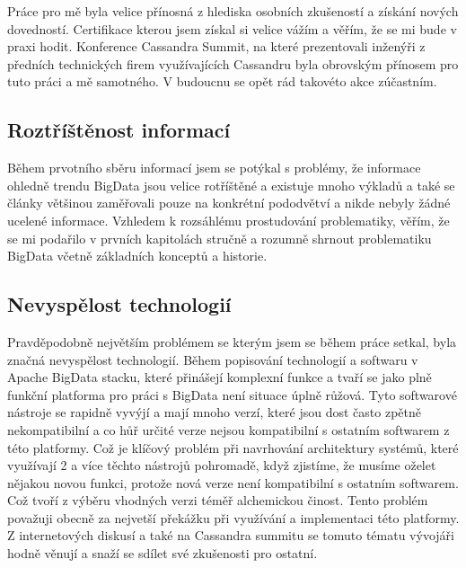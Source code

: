 Práce pro mě byla velice přínosná z hlediska osobních zkušeností a získání nových dovedností. Certifikace kterou jsem získal si velice vážím a věřím, že se mi bude v praxi hodit. Konference Cassandra Summit, na které prezentovali inženýři z předních technických firem využívajících Cassandru byla obrovským přínosem pro tuto práci a mě samotného. V budoucnu se opět rád takovéto akce zúčastním. 

\subsection{Roztříštěnost informací}
Během prvotního sběru informací jsem se potýkal s problémy, že informace ohledně trendu BigData jsou velice rotříštěné a existuje mnoho výkladů a také se články většinou zaměřovali pouze na konkrétní pododvětví a nikde nebyly žádné ucelené informace. Vzhledem k rozsáhlému prostudování problematiky, věřím, že se mi podařilo v prvních kapitolách stručně a rozumně shrnout problematiku BigData včetně základních konceptů a historie. 

\subsection{Nevyspělost technologií}
Pravděpodobně největším problémem se kterým jsem se během práce setkal, byla značná nevyspělost technologií. Během popisování technologií a softwaru v Apache BigData stacku, které přinášejí komplexní funkce a tvaří se jako plně funkční platforma pro práci s BigData není situace úplně růžová. Tyto softwarové nástroje se rapidně vyvýjí a mají mnoho verzí, které jsou dost často zpětně nekompatibilní a co hůř určité verze nejsou kompatibilní s ostatním softwarem z této platformy.  Což je klíčový problém při navrhování architektury systémů, které využívají 2 a více těchto nástrojů pohromadě, když zjistíme, že musíme oželet nějakou novou funkci, protože nová verze není kompatibilní s ostatním softwarem. Což tvoří z výběru vhodných verzi téměř alchemickou činost. Tento problém považuji obecně za nejvetší překážku při využívání a implementaci této platformy. Z internetových diskusí a také na Cassandra summitu se tomuto tématu vývojáři hodně věnují a snaží se sdílet své zkušenosti pro ostatní.  

